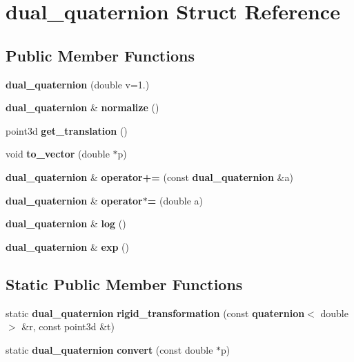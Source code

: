 \section{dual\-\_\-quaternion Struct Reference}
\label{structdual__quaternion}
\subsection*{Public Member Functions}
\begin{DoxyCompactItemize}
\item 
{\bfseries dual\-\_\-quaternion} (double v=1.)\label{structdual__quaternion_ac62c1be24e57fa9eaf9242edea0371f2}

\item 
{\bf dual\-\_\-quaternion} \& {\bfseries normalize} ()\label{structdual__quaternion_a768afa2d1144c79a3a7bcf17b8cbc859}

\item 
point3d {\bfseries get\-\_\-translation} ()\label{structdual__quaternion_ace1f35fd21a5b4b557edf729bd984c4f}

\item 
void {\bfseries to\-\_\-vector} (double $\ast$p)\label{structdual__quaternion_a5cae9b20969ab83acabed710320076f4}

\item 
{\bf dual\-\_\-quaternion} \& {\bfseries operator+=} (const {\bf dual\-\_\-quaternion} \&a)\label{structdual__quaternion_a549dc195cf2516efe1b68ab5384eb027}

\item 
{\bf dual\-\_\-quaternion} \& {\bfseries operator$\ast$=} (double a)\label{structdual__quaternion_a607d62d4c6f9baa87d3d851c5378b70d}

\item 
{\bf dual\-\_\-quaternion} \& {\bfseries log} ()\label{structdual__quaternion_a482799a3bd78cb3b073563bcbac0d670}

\item 
{\bf dual\-\_\-quaternion} \& {\bfseries exp} ()\label{structdual__quaternion_a83780cfafc1150b5d30fa67b089a156f}

\end{DoxyCompactItemize}
\subsection*{Static Public Member Functions}
\begin{DoxyCompactItemize}
\item 
static {\bf dual\-\_\-quaternion} {\bfseries rigid\-\_\-transformation} (const {\bf quaternion}$<$ double $>$ \&r, const point3d \&t)\label{structdual__quaternion_a5fba0f36b01709546950a47749d40eb6}

\item 
static {\bf dual\-\_\-quaternion} {\bfseries convert} (const double $\ast$p)\label{structdual__quaternion_aa12a1862743d459a08864924972a4139}

\end{DoxyCompactItemize}
